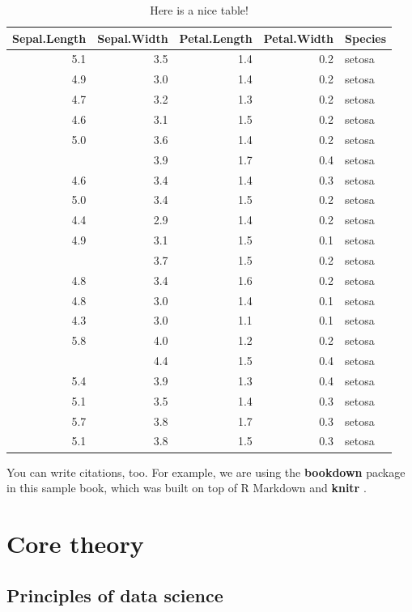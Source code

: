 \documentclass[
]{book}
\begin{document}
\begin{table}

\caption{\label{tab:nice-tab}Here is a nice table!}
\centering
\begin{tabular}[t]{rrrrl}
\toprule
Sepal.Length & Sepal.Width & Petal.Length & Petal.Width & Species\\
\midrule
5.1 & 3.5 & 1.4 & 0.2 & setosa\\
4.9 & 3.0 & 1.4 & 0.2 & setosa\\
4.7 & 3.2 & 1.3 & 0.2 & setosa\\
4.6 & 3.1 & 1.5 & 0.2 & setosa\\
5.0 & 3.6 & 1.4 & 0.2 & setosa\\
\addlinespace
5.4 & 3.9 & 1.7 & 0.4 & setosa\\
4.6 & 3.4 & 1.4 & 0.3 & setosa\\
5.0 & 3.4 & 1.5 & 0.2 & setosa\\
4.4 & 2.9 & 1.4 & 0.2 & setosa\\
4.9 & 3.1 & 1.5 & 0.1 & setosa\\
\addlinespace
5.4 & 3.7 & 1.5 & 0.2 & setosa\\
4.8 & 3.4 & 1.6 & 0.2 & setosa\\
4.8 & 3.0 & 1.4 & 0.1 & setosa\\
4.3 & 3.0 & 1.1 & 0.1 & setosa\\
5.8 & 4.0 & 1.2 & 0.2 & setosa\\
\addlinespace
5.7 & 4.4 & 1.5 & 0.4 & setosa\\
5.4 & 3.9 & 1.3 & 0.4 & setosa\\
5.1 & 3.5 & 1.4 & 0.3 & setosa\\
5.7 & 3.8 & 1.7 & 0.3 & setosa\\
5.1 & 3.8 & 1.5 & 0.3 & setosa\\
\bottomrule
\end{tabular}
\end{table}

You can write citations, too. For example, we are using the \textbf{bookdown} package \citep{R-bookdown} in this sample book, which was built on top of R Markdown and \textbf{knitr} \citep{xie2015}.

\hypertarget{core-theory}{%
\chapter{Core theory}\label{core-theory}}

\hypertarget{principles-of-data-science}{%
\section{Principles of data science}\label{principles-of-data-science}}
\end{document}
